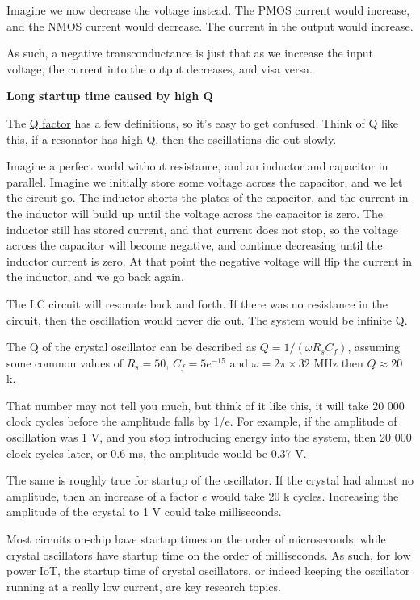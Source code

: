 Imagine we now decrease the voltage instead. The PMOS current would
increase, and the NMOS current would decrease. The current in the output
would increase.

As such, a negative transconductance is just that as we increase the
input voltage, the current into the output decreases, and visa versa.

\textbf{Long startup time caused by high Q}

The \href{https://en.wikipedia.org/wiki/Q_factor}{Q factor} has a few
definitions, so it's easy to get confused. Think of Q like this, if a
resonator has high Q, then the oscillations die out slowly.

Imagine a perfect world without resistance, and an inductor and
capacitor in parallel. Imagine we initially store some voltage across
the capacitor, and we let the circuit go. The inductor shorts the plates
of the capacitor, and the current in the inductor will build up until
the voltage across the capacitor is zero. The inductor still has stored
current, and that current does not stop, so the voltage across the
capacitor will become negative, and continue decreasing until the
inductor current is zero. At that point the negative voltage will flip
the current in the inductor, and we go back again.

The LC circuit will resonate back and forth. If there was no resistance
in the circuit, then the oscillation would never die out. The system
would be infinite Q.

The Q of the crystal oscillator can be described as
\(Q = 1/(\omega R_s C_f)\), assuming some common values of \(R_s = 50\),
\(C_f = 5e^{-15}\) and \(\omega = 2 \pi \times 32\) MHz then
\(Q \approx 20\) k.

That number may not tell you much, but think of it like this, it will
take 20 000 clock cycles before the amplitude falls by 1/e. For example,
if the amplitude of oscillation was 1 V, and you stop introducing energy
into the system, then 20 000 clock cycles later, or 0.6 ms, the
amplitude would be 0.37 V.

The same is roughly true for startup of the oscillator. If the crystal
had almost no amplitude, then an increase of a factor \(e\) would take
20 k cycles. Increasing the amplitude of the crystal to 1 V could take
milliseconds.

Most circuits on-chip have startup times on the order of microseconds,
while crystal oscillators have startup time on the order of
milliseconds. As such, for low power IoT, the startup time of crystal
oscillators, or indeed keeping the oscillator running at a really low
current, are key research topics.

